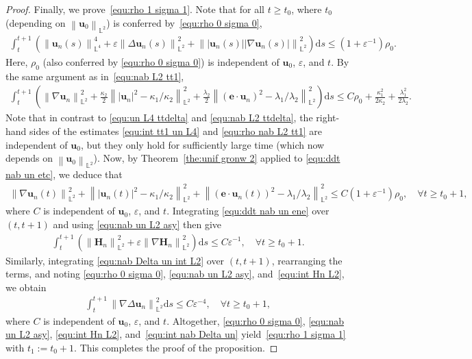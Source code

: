 \documentclass[11pt, reqno]{amsart}
\theoremstyle{definition}
\numberwithin{equation}{section}
\newcommand{\bff}{\boldsymbol}
\newcommand{\bb}{\mathbb}
\newcommand{\ds}{\mathrm{d}s}
\newcommand{\norm}[2]{\left\|{#1}\right\|_{#2}}
\begin{document}
\begin{proof}
 
    Finally, we prove~\eqref{equ:rho 1 sigma 1}. Note that for all $t\geq t_0$, where $t_0$ (depending on $\norm{\bff{u}_0}{\bb{L}^2}$) is conferred by~\eqref{equ:rho 0 sigma 0}, 
    \begin{align}\label{equ:int tt1 un L4}
        \int_t^{t+1} \left(\norm{\bff{u}_n(s)}{\bb{L}^4}^4 + \varepsilon \norm{\Delta \bff{u}_n(s)}{\bb{L}^2}^2 + \norm{|\bff{u}_n(s)| |\nabla \bff{u}_n(s)|}{\bb{L}^2}^2 \right) \ds 
    \leq (1+\varepsilon^{-1}) \rho_0.
    \end{align}
    Here, $\rho_0$ (also conferred by \eqref{equ:rho 0 sigma 0}) is independent of $\bff{u}_0$, $\varepsilon$, and $t$. By the same argument as in~\eqref{equ:nab L2 tt1},
\begin{align}\label{equ:rho nab L2 tt1}
    \int_t^{t+1} \left(
		\norm{\nabla \bff{u}_n}{\bb{L}^2}^2
        +
        \frac{\kappa_2}{2} \norm{ |\bff{u}_n|^2 - \kappa_1/\kappa_2}{\bb{L}^2}^2
        +
        \frac{\lambda_2}{2} \norm{(\bff{e}\cdot \bff{u}_n)^2- \lambda_1/\lambda_2}{\bb{L}^2}^2 \right) \ds
     \leq
     C\rho_0+ \frac{\kappa_1^2}{2\kappa_2}+ \frac{\lambda_1^2}{2\lambda_2}.
\end{align}
    Note that in contrast to \eqref{equ:un L4 ttdelta} and \eqref{equ:nab L2 ttdelta}, the right-hand sides of the estimates \eqref{equ:int tt1 un L4} and \eqref{equ:rho nab L2 tt1} are independent of $\bff{u}_0$, but they only hold for sufficiently large time (which now depends on $\norm{\bff{u}_0}{\bb{L}^2}$).
    Now, by Theorem~\ref{the:unif gronw 2} applied to \eqref{equ:ddt nab un etc}, we deduce that
	\begin{align}\label{equ:nab un L2 asy}
		\norm{\nabla \bff{u}_n(t)}{\bb{L}^2}^2
		+
		\norm{ |\bff{u}_n(t)|^2 - \kappa_1/\kappa_2}{\bb{L}^2}^2
        +
        \norm{(\bff{e}\cdot \bff{u}_n(t))^2- \lambda_1/\lambda_2}{\bb{L}^2}^2 
		\leq
		C(1+\varepsilon^{-1}) \rho_0, 
		\quad
		\forall t\geq t_0+1,
	\end{align}
    where $C$ is independent of $\bff{u}_0$, $\varepsilon$, and $t$.
	Integrating \eqref{equ:ddt nab un ene} over $(t,t+1)$ and using \eqref{equ:nab un L2 asy} then give
	\begin{align}\label{equ:int Hn L2}
		\int_t^{t+1} \left(\norm{\bff{H}_n}{\bb{L}^2}^2
		+
		\varepsilon \norm{\nabla \bff{H}_n}{\bb{L}^2}^2 \right) \ds
		\leq 
		C\varepsilon^{-1}, 
		\quad
		\forall t\geq t_0+1.
	\end{align}
	Similarly, integrating \eqref{equ:nab Delta un int L2} over $(t,t+1)$, rearranging the terms, and noting \eqref{equ:rho 0 sigma 0}, \eqref{equ:nab un L2 asy}, and~\eqref{equ:int Hn L2}, we obtain
	\begin{align}\label{equ:int nab Delta un}
		\int_t^{t+1} \norm{\nabla \Delta \bff{u}_n}{\bb{L}^2}^2 \ds
		\leq
		C\varepsilon^{-4},
		\quad 
		\forall t\geq t_0+1,
	\end{align}
	where $C$ is independent of $\bff{u}_0$, $\varepsilon$, and $t$. Altogether, \eqref{equ:rho 0 sigma 0}, \eqref{equ:nab un L2 asy}, \eqref{equ:int Hn L2}, and~\eqref{equ:int nab Delta un} yield~\eqref{equ:rho 1 sigma 1} with $t_1:=t_0+1$.
	This completes the proof of the proposition.
\end{proof}
\end{document}
